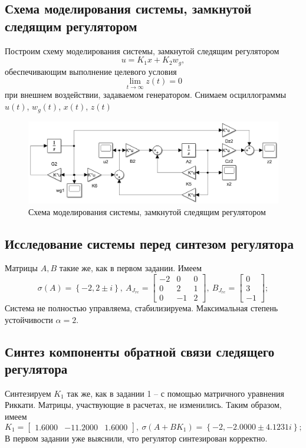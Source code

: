 \documentclass[a4paper, 12pt]{article}
\begin{document}
    \subsection{Схема моделирования системы, замкнутой следящим регулятором}
    Построим схему моделирования системы, замкнутой следящим регулятором
    $$
    u=K_1x+K_2 w_g,
    $$
    обеспечивающим выполнение целевого условия
    $$\lim\limits_{t\to\infty}z(t)=0$$
    при внешнем воздействии, задаваемом генератором. Снимаем осциллограммы $u(t)$, $w_g(t)$, $x(t)$, $z(t)$
    \begin{figure}[H]
        \centering
        \includegraphics[scale=0.325]{2task_scheme.png}
        \captionsetup{skip=0pt}
        \caption{Схема моделирования системы, замкнутой следящим регулятором}
        \label{fig:2task_scheme}
    \end{figure}


    \subsection{Исследование системы перед синтезом регулятора}
    Матрицы $A,B$ такие же, как в первом задании. Имеем
    $$
    \sigma\left( A \right)=\left\{ -2,2\pm i \right\},\ A_{J_{re}}=\begin{bmatrix}
        -2     &0     &0\\
        0     &2     &1\\
        0    &-1     &2
        \end{bmatrix},\ B_{J_{re}}=\begin{bmatrix}
        0\\
         3\\
        -1
        \end{bmatrix};
    $$
    Система не полностью управляема, стабилизируема. Максимальная степень устойчивости $\alpha=2$.


    \subsection{Синтез компоненты обратной связи следящего регулятора}
    Синтезируем $K_1$ так же, как в задании 1 -- с помощью матричного уравнения Риккати.
    Матрицы, участвующие в расчетах, не изменились. Таким образом, имеем
    $$
    K_1=\begin{bmatrix}
    1.6000  &-11.2000    &1.6000
    \end{bmatrix},\
    \sigma\left( A+BK_1 \right)=\left\{ -2,-2.0000 \pm 4.1231i \right\};
    $$
    В первом задании уже выяснили, что регулятор синтезирован корректно.
\end{document}
